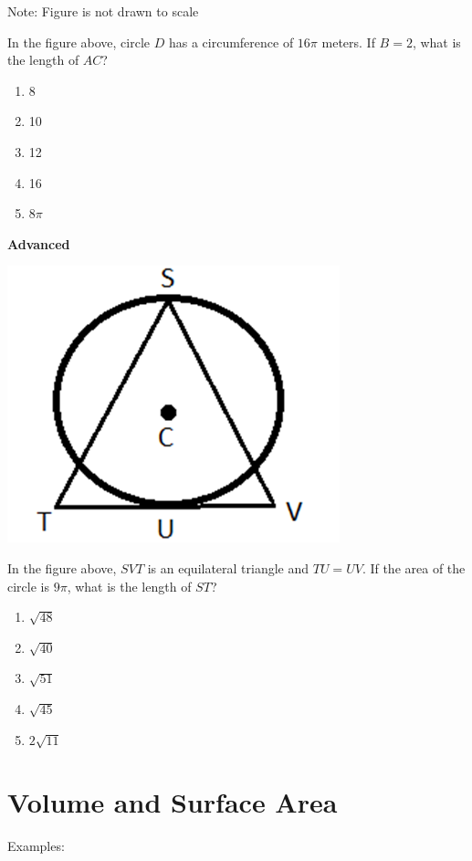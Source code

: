 \documentclass[12pt]{book}
\newcommand{\advanced}{\textbf{Advanced} }
\begin{document}
\begin{multienumerate}
{Note: Figure is not drawn to scale

\bigskip
In the figure above, circle $D$ has a circumference of $16\pi$ meters. If $B=2$, what is the length of $AC$?

\begin{enumerate}[label=(\Alph*)]
\item 8
\item 10
\item 12
\item 16
\item $8\pi$
\end{enumerate}
}{\advanced

\includegraphics{25}

In the figure above, $SVT$ is an equilateral triangle and $TU=UV$. If the area of the circle is $9\pi$, what is the length of $ST$?

\begin{enumerate}[label=(\Alph*)]
\item $\sqrt{48}$
\item $\sqrt{40}$
\item $\sqrt{51}$
\item $\sqrt{45}$
\item $2\sqrt{11}$
\end{enumerate}}
\end{multienumerate}

\newpage
\section{Volume and Surface Area}

Examples:
\end{document}
